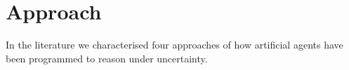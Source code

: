 % 

\section{Approach}\label{sec:approach}

In the literature we characterised four approaches of how artificial agents have been programmed to reason under uncertainty. 

